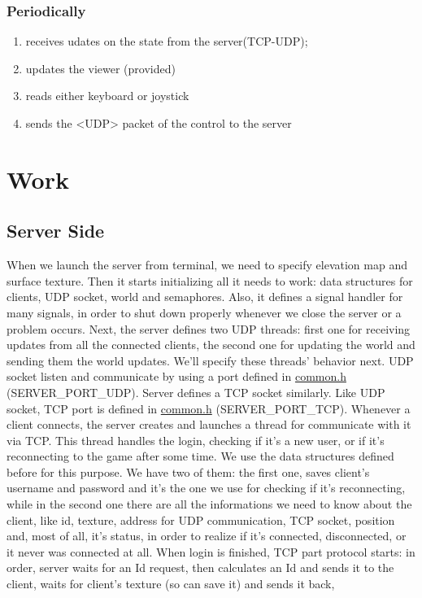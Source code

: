 \documentclass{report}
\begin{document}
\subsection{Periodically}
\begin{enumerate}
\item receives udates on the state from the server(TCP-UDP);
\item updates the viewer (provided)
\item reads either keyboard or joystick
\item sends the <UDP> packet of the control to the server
\end{enumerate}
\chapter{Work}
\section{Server Side}
When we launch the server from terminal, we need to specify elevation map and surface texture.
Then it starts initializing all it needs to work: data structures for clients, UDP socket, world and
semaphores. Also, it defines a signal handler for many signals, in order to shut down properly
whenever we close the server or a problem occurs.
Next, the server defines two UDP threads: first one for receiving updates from all the connected
clients, the second one for updating the world and sending them the world updates. We’ll specify
these threads’ behavior next.
UDP socket listen and communicate by using a port defined in \underline{common.h} (SERVER\_PORT\_UDP).
Server defines a TCP socket similarly. Like UDP socket, TCP port is defined in \underline{common.h}
(SERVER\_PORT\_TCP).
Whenever a client connects, the server creates and launches a thread for communicate with it via
TCP. This thread handles the login, checking if it’s a new user, or if it’s reconnecting to the game
after some time. We use the data structures defined before for this purpose. We have two of them:
the first one, saves client’s username and password and it’s the one we use for checking if it’s
reconnecting, while in the second one there are all the informations we need to know about the
client, like id, texture, address for UDP communication, TCP socket, position and, most of all, it’s
status, in order to realize if it’s connected, disconnected, or it never was connected at all.
When login is finished, TCP part protocol starts: in order, server waits for an Id request, then
calculates an Id and sends it to the client, waits for client’s texture (so can save it) and sends it back,
\end{document}
